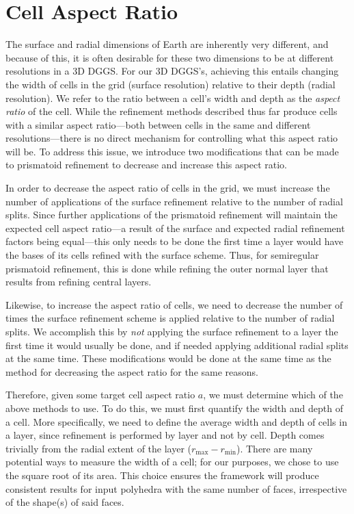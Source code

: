 \section{Cell Aspect Ratio} \label{chap:5:ar}
The surface and radial dimensions of Earth are inherently very different, and because of this, it is often desirable for these two dimensions to be at different resolutions in a 3D DGGS.
For our 3D DGGS's, achieving this entails changing the width of cells in the grid (surface resolution) relative to their depth (radial resolution).
We refer to the ratio between a cell's width and depth as the \textit{aspect ratio} of the cell.
While the refinement methods described thus far produce cells with a similar aspect ratio---both between cells in the same and different resolutions---there is no direct mechanism for controlling what this aspect ratio will be.
To address this issue, we introduce two modifications that can be made to prismatoid refinement to decrease and increase this aspect ratio.


In order to decrease the aspect ratio of cells in the grid, we must increase the number of applications of the surface refinement relative to the number of radial splits.
Since further applications of the prismatoid refinement will maintain the expected cell aspect ratio---a result of the surface and expected radial refinement factors being equal---this only needs to be done the first time a layer would have the bases of its cells refined with the surface scheme.
Thus, for semiregular prismatoid refinement, this is done while refining the outer normal layer that results from refining central layers.


Likewise, to increase the aspect ratio of cells, we need to decrease the number of times the surface refinement scheme is applied relative to the number of radial splits.
We accomplish this by \textit{not} applying the surface refinement to a layer the first time it would usually be done, and if needed applying additional radial splits at the same time.
These modifications would be done at the same time as the method for decreasing the aspect ratio for the same reasons.


Therefore, given some target cell aspect ratio $a$, we must determine which of the above methods to use.
To do this, we must first quantify the width and depth of a cell.
More specifically, we need to define the average width and depth of cells in a layer, since refinement is performed by layer and not by cell.
Depth comes trivially from the radial extent of the layer ($r_\mathrm{max} - r_\mathrm{min}$).
There are many potential ways to measure the width of a cell; for our purposes, we chose to use the square root of its area.
This choice ensures the framework will produce consistent results for input polyhedra with the same number of faces, irrespective of the shape(s) of said faces.


